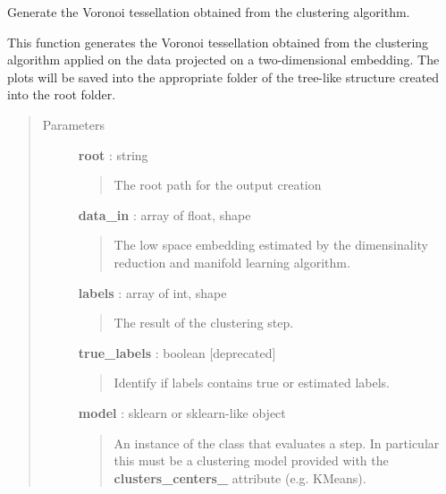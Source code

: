 \documentclass[letterpaper,10pt,english]{sphinxmanual}
\begin{document}
\begin{fulllineitems}
\label{index:adenine.core.plotting.voronoi}
Generate the Voronoi tessellation obtained from the clustering algorithm.

This function generates the Voronoi tessellation obtained from the
clustering algorithm applied on the data projected on a two-dimensional
embedding. The plots will be saved into the appropriate folder of the
tree-like structure created into the root folder.
\begin{quote}\begin{description}
\item[{Parameters}] \leavevmode
\textbf{root} : string
\begin{quote}

The root path for the output creation
\end{quote}

\textbf{data\_in} : array of float, shape
\begin{quote}

The low space embedding estimated by the dimensinality reduction and
manifold learning algorithm.
\end{quote}

\textbf{labels} : array of int, shape
\begin{quote}

The result of the clustering step.
\end{quote}

\textbf{true\_labels} : boolean {[}deprecated{]}
\begin{quote}

Identify if labels contains true or estimated labels.
\end{quote}

\textbf{model} : sklearn or sklearn-like object
\begin{quote}

An instance of the class that evaluates a step. In particular this must
be a clustering model provided with the {\color{red}\bfseries{}clusters\_centers\_} attribute
(e.g. KMeans).
\end{quote}

\end{description}\end{quote}

\end{fulllineitems}
\end{document}
